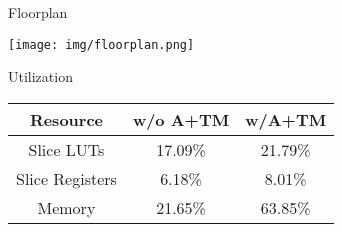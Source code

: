\begin{block}{Floorplan}

\texttt{[image: img/floorplan.png]}

Utilization

\begin{center}
\begin{tabular}{ | c | c | c |  } \hline
    Resource        & w/o A+TM & w/A+TM  \\ \hline
    Slice LUTs      & 17.09\%   &  21.79\%   \\  \hline
    Slice Registers & 6.18\%    &  8.01\%    \\  \hline
    Memory          & 21.65\%   &  63.85\%   \\  \hline
\end{tabular}
\end{center}




\end{block}
